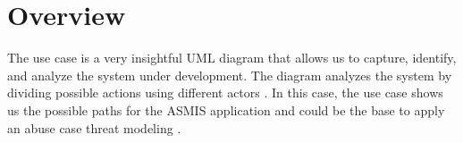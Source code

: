 \section{Overview}
The use case is a very insightful UML diagram that allows us to capture, identify, and analyze the system under development. The diagram analyzes the system by dividing possible actions using different actors \citep[p.~64]{jacobson2021unified}. In this case, the use case shows us the possible paths for the ASMIS application and could be the base to apply an abuse case threat modeling \citep [p.~59]{usecase_abuse_case}.

